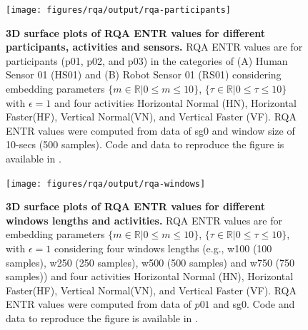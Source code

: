 \documentclass[fleqn,10pt]{wlscirep}
\begin{document}

\begin{figure}[ht]
\centering
\texttt{[image: figures/rqa/output/rqa-participants]}
    \caption{
	{\bf 3D surface plots of RQA ENTR values for different participants, activities and sensors.}
	RQA ENTR values are for participants (p01, p02, and p03) 
	in the categories of 
	(A) Human Sensor 01 (HS01) and 
	(B) Robot Sensor 01 (RS01)
	considering embedding parameters
	$ \{ m \in \mathbb{R} | 0 \le m \le 10  \}$,
	$ \{ \tau \in \mathbb{R} | 0 \le \tau \le 10  \}$
	with $\epsilon = 1$ and four activities 
	Horizontal Normal (HN), Horizontal Faster(HF), Vertical Normal(VN), and 
	Vertical Faster (VF).
	RQA ENTR values were computed from data of sg0 and window size of 10-secs (500 samples).
	Code and data to reproduce the figure is available in \cite{srep2021}.
       }
\label{fig:3dRQAENTR_participantsactivities}
\end{figure}

\begin{figure}[ht]
\centering
\texttt{[image: figures/rqa/output/rqa-windows]}
    \caption{
	{\bf 3D surface plots of RQA ENTR values for different windows lengths and activities.}
	RQA ENTR values are for embedding parameters
	$ \{ m \in \mathbb{R} | 0 \le m \le 10  \}$,
	$ \{ \tau \in \mathbb{R} | 0 \le \tau \le 10  \}$, 
	with $\epsilon = 1 $ considering four 
	windows lengths (e.g., w100 (100 samples), w250 (250 samples),
	w500 (500 samples) and w750 (750 samples)) and
	four activities 
	Horizontal Normal (HN), Horizontal Faster(HF), Vertical Normal(VN), and 
	Vertical Faster (VF).
	RQA ENTR values were computed from data of $p01$ and sg0.
	Code and data to reproduce the figure is available in \cite{srep2021}.
       }
\label{fig:3dRQAENTR_windowsactivities}
\end{figure}
\end{document}
